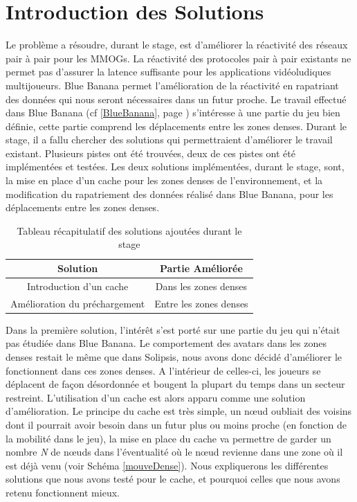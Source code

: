\section{Introduction des Solutions}
\label{introSolutions}
	Le problème a résoudre, durant le stage, est d'améliorer la réactivité des réseaux pair à pair pour les MMOGs. La réactivité des protocoles pair à pair existants ne permet pas d'assurer la latence suffisante pour les applications vidéoludiques multijoueurs. Blue Banana permet l'amélioration de la réactivité en rapatriant des données qui nous seront nécessaires dans un futur proche. Le travail effectué dans Blue Banana (cf \ref{BlueBanana}, page \pageref{BlueBanana}) s'intéresse à une partie du jeu bien définie, cette partie comprend les déplacements entre les zones denses. Durant le stage, il a fallu chercher des solutions qui permettraient d'améliorer le travail existant. Plusieurs pistes ont été trouvées, deux de ces pistes ont été implémentées et testées. Les deux solutions implémentées, durant le stage, sont, la mise en place d'un cache pour les zones denses de l'environnement, et la modification du rapatriement des données réalisé dans Blue Banana, pour les déplacements entre les zones denses.
\begin{table}[!h]
  \begin{center}
    \begin{tabular}{|c|c|}
      \hline
      Solution & Partie Améliorée \\
      \hline
      Introduction d'un cache  & Dans les zones denses \\
      Amélioration du préchargement & Entre les zones denses \\
      \hline
    \end{tabular}
  \end{center}
  \label{tab:config2}
  \caption{Tableau récapitulatif des solutions ajoutées durant le stage}
\end{table}
\par Dans la première solution, l'intérêt s'est porté sur une partie du jeu qui n'était pas étudiée dans Blue Banana. Le comportement des avatars dans les zones denses restait le même que dans Solipsis, nous avons donc décidé d'améliorer le fonctionnent dans ces zones denses. A l'intérieur de celles-ci, les joueurs se déplacent de façon désordonnée et bougent la plupart du temps dans un secteur restreint. L'utilisation d'un cache est alors apparu comme une solution d'amélioration. Le principe du cache est très simple, un nœud oubliait des voisins dont il pourrait avoir besoin dans un futur plus ou moins proche (en fonction de la mobilité dans le jeu), la mise en place du cache va permettre de garder un nombre \textit{N} de nœuds dans l'éventualité où le nœud revienne dans une zone où il est déjà venu (voir Schéma \ref{mouveDense}). Nous expliquerons les différentes solutions que nous avons testé pour le cache, et pourquoi celles que nous avons retenu fonctionnent mieux.
